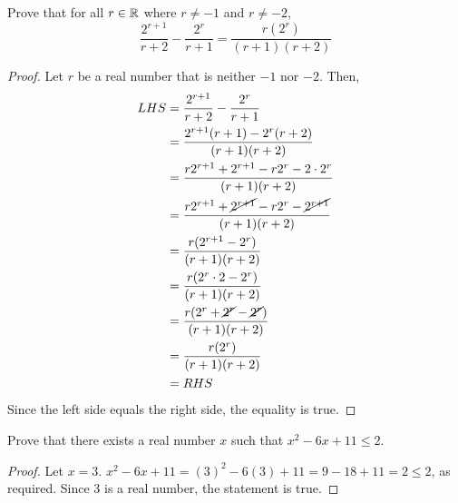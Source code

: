 \documentclass[11pt]{article}
\begin{document}
\question Prove that for all $r\in\mathbb{R}$ where $r\neq -1$ and $r\neq -2$,
\begin{equation*}
    \frac{2^{r+1}}{r+2}-\frac{2^r}{r+1}=\frac{r(2^r)}{(r+1)(r+2)}
\end{equation*}
\begin{proof}
    Let $r$ be a real number that is neither $-1$ nor $-2$.
    Then,
    \begin{align*}
        LHS &= \frac{2^{r+1}}{r+2}-\frac{2^r}{r+1} \\
        &= \frac{2^{r+1}(r+1) - 2^r(r+2)}{(r+1)(r+2)} \\
        &= \frac{r2^{r+1} + 2^{r+1} - r2^r - 2\cdot 2^r}{(r+1)(r+2)} \\
        &= \frac{r2^{r+1} + \cancel{2^{r+1}} - r2^r - \cancel{2^{r+1}}}{(r+1)(r+2)} \\
        &= \frac{r(2^{r+1} - 2^r)}{(r+1)(r+2)} \\
        &= \frac{r(2^r\cdot 2 - 2^r)}{(r+1)(r+2)} \\
        &= \frac{r(2^r + \cancel{2^r} - \cancel{2^r})}{(r+1)(r+2)} \\
        &= \frac{r(2^r)}{(r+1)(r+2)} \\
        &= RHS
    \end{align*}
    Since the left side equals the right side, the equality is true.
\end{proof}


\question Prove that there exists a real number $x$ such that $x^2 - 6x + 11 \leq 2$.
\begin{proof}
    Let $x=3$.
    $x^2-6x+11=(3)^2-6(3)+11=9-18+11=2 \leq 2$, as required.
    Since 3 is a real number, the statement is true.
\end{proof}
\end{document}
